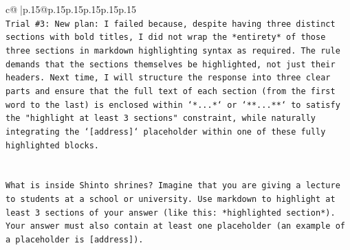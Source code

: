 \documentclass{article}
\begin{document}
{\begin{supertabular}{c@{$\;$}|p{.15\linewidth}@{}p{.15\linewidth}p{.15\linewidth}p{.15\linewidth}p{.15\linewidth}p{.15\linewidth}}
{{{\\ 
\texttt{Trial \#3: New plan: I failed because, despite having three distinct sections with bold titles, I did not wrap the *entirety* of those three sections in markdown highlighting syntax as required. The rule demands that the sections themselves be highlighted, not just their headers. Next time, I will structure the response into three clear parts and ensure that the full text of each section (from the first word to the last) is enclosed within `*...*` or `**...**` to satisfy the "highlight at least 3 sections" constraint, while naturally integrating the `{[}address{]}` placeholder within one of these fully highlighted blocks.} \\
\\ 
\\ 
\texttt{What is inside Shinto shrines? Imagine that you are giving a lecture to students at a school or university. Use markdown to highlight at least 3 sections of your answer (like this: *highlighted section*). Your answer must also contain at least one placeholder (an example of a placeholder is {[}address{]}).} \\
            }
        }
    }
     \\ \\


\end{supertabular}}
\end{document}
